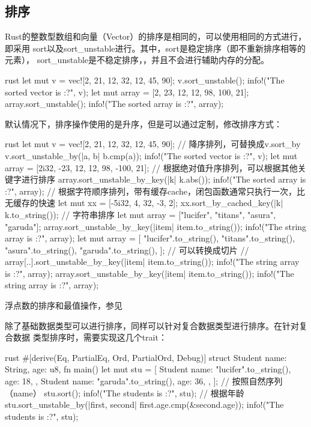 \subsection{排序}
Rust的整数型数组和向量（Vector）的排序是相同的，可以使用相同的方式进行，即采用
sort以及sort\_unstable进行。其中，sort是稳定排序（即不重新排序相等的元素），
sort\_unstable是不稳定排序，，并且不会进行辅助内存的分配。
\begin{code-block}{rust}
let mut v = vec![2, 21, 12, 32, 12, 45, 90];
v.sort_unstable();
info!("The sorted vector is {:?}", v);
let mut array = [2, 23, 12, 12, 98, 100, 21];
array.sort_unstable();
info!("The sorted array is {:?}", array);
\end{code-block}
默认情况下，排序操作使用的是升序，但是可以通过定制，修改排序方式：
\begin{code-block}{rust}
let mut v = vec![2, 21, 12, 32, 12, 45, 90];
// 降序排列，可替换成v.sort_by
v.sort_unstable_by(|a, b| b.cmp(a));
info!("The sorted vector is {:?}", v);
let mut array = [2i32, -23, 12, 12, 98, -100, 21];
// 根据绝对值升序排列，可以根据其他关键字进行排序
array.sort_unstable_by_key(|k| k.abs());
info!("The sorted array is {:?}", array);
// 根据字符顺序排列，带有缓存cache，闭包函数通常只执行一次，比无缓存的快速
let mut xx = [-5i32, 4, 32, -3, 2];
xx.sort_by_cached_key(|k| k.to_string());
// 字符串排序
let mut array = ["lucifer", "titans", "asura", "garuda"];
array.sort_unstable_by_key(|item| item.to_string());
info!("The string array is {:?}", array);
let mut array = [
    "lucifer".to_string(),
    "titans".to_string(),
    "asura".to_string(),
    "garuda".to_string(),
];
// 可以转换成切片
// array[..].sort_unstable_by_key(|item| item.to_string());                                                                                                                               info!("The string array is {:?}", array);
array.sort_unstable_by_key(|item| item.to_string());                                                                                                                               info!("The string array is {:?}", array);
\end{code-block}

浮点数的排序和最值操作，参见

除了基础数据类型可以进行排序，同样可以针对复合数据类型进行排序。在针对复合数据
类型排序时，需要实现这几个trait：
\begin{code-block}{rust}
#[derive(Eq, PartialEq, Ord, PartialOrd, Debug)]
struct Student {
    name: String,
    age: u8,
}
fn main() {
    let mut stu = [
        Student {
            name: "lucifer".to_string(),
            age: 18,
        },
        Student {
            name: "garuda".to_string(),
            age: 36,
        },
    ];
    // 按照自然序列（name）
    stu.sort();
    info!("The students is {:?}", stu);
    // 根据年龄
    stu.sort_unstable_by(|first, second| first.age.cmp(&second.age));
    info!("The students is {:?}", stu);
}
\end{code-block}

